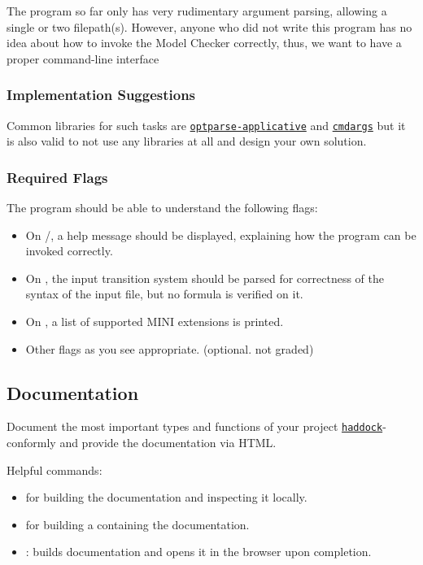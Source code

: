 \documentclass{article}
\begin{document}
The program so far only has very rudimentary argument parsing, allowing a single or two filepath(s). However, anyone who did not write this program has no idea about how to invoke the Model Checker correctly, thus, we want to have a proper command-line interface

\subsubsection*{Implementation Suggestions}

Common libraries for such tasks are \href{https://hackage.haskell.org/package/optparse-applicative}{\texttt{optparse-applicative}} 
and \href{https://hackage.haskell.org/package/cmdargs}{\texttt{cmdargs}} but it is also valid to not use any libraries at all 
and design your own solution.

\subsubsection*{Required Flags}

The program should be able to understand the following flags:

\begin{itemize}
\item On /, a help message should be displayed, explaining how the program can be invoked correctly.
\item On , the input transition system should be parsed for correctness of the syntax of the input file, but no formula is verified on it.
\item On , a list of supported MINI extensions is printed.
\item Other flags as you see appropriate. (optional. not graded)
\end{itemize}

\subsection{Documentation}

Document the most important types and functions of your project \href{https://haskell-haddock.readthedocs.io/en/latest/markup.html}{\texttt{haddock}}-conformly and provide the documentation via HTML.

Helpful commands:

\begin{itemize}
\item {} for building the documentation and inspecting it locally.
\item {} for building a  containing the documentation.
\item {}: builds documentation and opens it in the browser upon completion.
\end{itemize}
\end{document}
